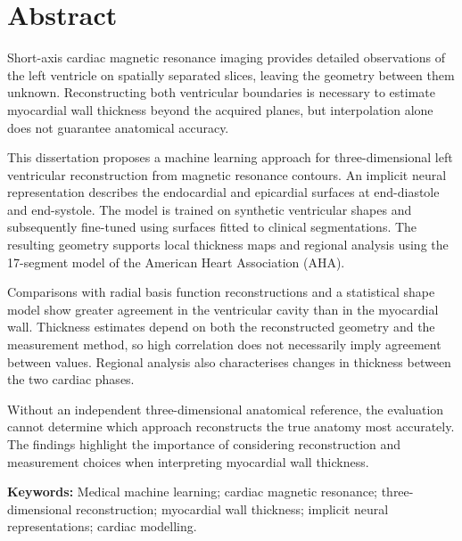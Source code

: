 \chapter*{Abstract}

\noindent
Short-axis cardiac magnetic resonance imaging provides detailed observations
of the left ventricle on spatially separated slices, leaving the geometry
between them unknown. Reconstructing both ventricular boundaries is necessary
to estimate myocardial wall thickness beyond the acquired planes, but
interpolation alone does not guarantee anatomical accuracy.

This dissertation proposes a machine learning approach for three-dimensional
left ventricular reconstruction from magnetic resonance contours. An implicit
neural representation describes the endocardial and epicardial surfaces at
end-diastole and end-systole. The model is trained on synthetic ventricular
shapes and subsequently fine-tuned using surfaces fitted to clinical
segmentations. The resulting geometry supports local thickness maps and
regional analysis using the 17-segment model of the American Heart Association
(AHA).

Comparisons with radial basis function reconstructions and a statistical
shape model show greater agreement in the ventricular cavity than in the
myocardial wall. Thickness estimates depend on both the reconstructed geometry
and the measurement method, so high correlation does not necessarily imply
agreement between values. Regional analysis also characterises changes in
thickness between the two cardiac phases.

Without an independent three-dimensional anatomical reference, the evaluation
cannot determine which approach reconstructs the true anatomy most accurately.
The findings highlight the importance of considering reconstruction and
measurement choices when interpreting myocardial wall thickness.

\vspace{1em}
\noindent\textbf{Keywords:} Medical machine learning; cardiac magnetic
resonance; three-dimensional reconstruction; myocardial wall thickness;
implicit neural representations; cardiac modelling.

\clearpage
